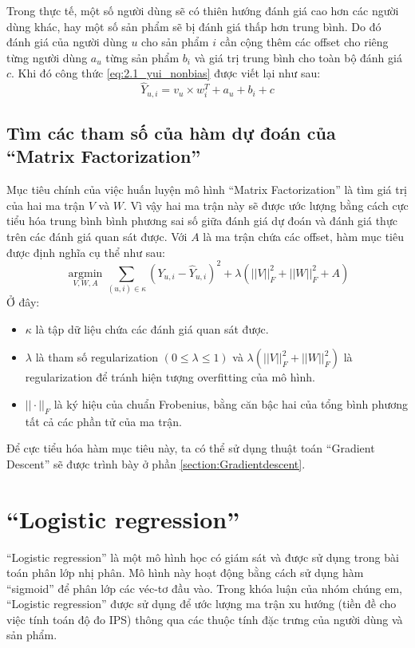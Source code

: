 Trong thực tế, một số người dùng sẽ có thiên hướng đánh giá cao hơn các người dùng khác, hay một số sản phẩm sẽ bị đánh giá thấp hơn trung bình. Do đó đánh giá của người dùng $u$ cho sản phẩm $i$ cần cộng thêm các offset cho riêng từng người dùng $a_u$ từng sản phẩm $b_i$ và giá trị trung bình cho toàn bộ đánh giá $c$. Khi đó công thức \ref{eq:2.1_yui_nonbias} được viết lại như sau:
\begin{equation}
\label{eq:2.1_yui_bias}
    \hat{Y}_{u,i} = v_{u}\times w_i^{T} + a_u + b_i + c
\end{equation}
\subsection{Tìm các tham số của hàm dự đoán của ``Matrix Factorization''}
Mục tiêu chính của việc huấn luyện mô hình ``Matrix Factorization'' là tìm giá trị của hai ma trận $V$ và $W$. Vì vậy hai ma trận này sẽ được ước lượng bằng cách cực tiểu hóa trung bình bình phương sai số giữa đánh giá dự đoán và đánh giá thực trên các đánh giá quan sát được. Với $A$ là ma trận chứa các offset, hàm mục tiêu được định nghĩa cụ thể như sau:
\begin{equation}
\label{eq:2.1_objective}
    \operatorname*{argmin}_{V,W,A} \sum_{(u,i)\in\kappa} (Y_{u,i} - \hat{Y}_{u,i})^2 + \lambda(||V||_{F}^2 + ||W||_{F}^2+A)
\end{equation}
Ở đây: 
\begin{itemize}
    \item $\kappa$ là tập dữ liệu chứa các đánh giá quan sát được.
    \item $\lambda$ là tham số regularization $(0 \leq \lambda \leq 1)$ và $\lambda(||V||_{F}^2 + ||W||_{F}^2)$ là regularization để tránh hiện tượng overfitting của mô hình.
    \item $||\cdot||_{F}$ là ký hiệu của chuẩn Frobenius, bằng căn bậc hai của tổng bình phương tất cả các phần tử của ma trận.
\end{itemize}

Để cực tiểu hóa hàm mục tiêu này, ta có thể sử dụng thuật toán ``Gradient Descent'' sẽ được trình bày ở phần \ref{section:Gradientdescent}.

\section{``Logistic regression''}
``Logistic regression'' là một mô hình học có giám sát và được sử dụng trong bài toán phân lớp nhị phân. Mô hình này hoạt động bằng cách sử dụng hàm ``sigmoid'' để phân lớp các véc-tơ đầu vào. Trong khóa luận của nhóm chúng em, ``Logistic regression'' được sử dụng để ước lượng ma trận xu hướng (tiền đề cho việc tính toán độ đo IPS) thông qua các thuộc tính đặc trưng của người dùng và sản phẩm.

